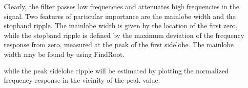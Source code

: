 \documentclass{article}
\begin{document}
\begin{CellGroup}
\begin{CellGroup}
\begin{CellGroup}
\end{CellGroup}
Clearly, the filter passes low frequencies and attenuates high frequencies  in the signal. Two features of particular importance are the mainlobe
width and the stopband ripple. The mainlobe width is given by the location of the first zero, while the stopband ripple is defined by the maximum
deviation of the  frequency response from zero, measured at the peak of the first sidelobe. The  mainlobe width may be found by using FindRoot.




\end{CellGroup}
\begin{CellGroup}

\end{CellGroup}
while the peak sidelobe ripple will be estimated by plotting the normalized frequency response in the vicinity of the peak value.

\begin{CellGroup}

\end{CellGroup}
\begin{CellGroup}



\end{CellGroup}

\end{CellGroup}
\end{document}
